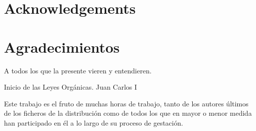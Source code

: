 %
%
%
% 
%
%
%
%

\thispagestyle{empty}

{
  \chapter*{Acknowledgements}
  \label{cha:acknowledgements}
}
{
  \chapter*{Agradecimientos}
  \label{cha:agradecimientos}
}

\begin{FraseCelebre}
  \begin{Frase}
    A todos los que la presente vieren y entendieren.
  \end{Frase}
  \begin{Fuente}
    Inicio de las Leyes Orgánicas. Juan Carlos I
  \end{Fuente}
\end{FraseCelebre}



Este trabajo es el fruto de muchas horas de trabajo, tanto de los autores últimos de los ficheros de la distribución como de todos los que en mayor o menor medida han participado en él a lo largo de su proceso de gestación.

